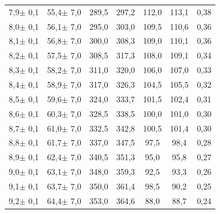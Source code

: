 \documentclass[titlepage = firstcover]{scrartcl}
\begin{document}
\begin{table}[h]
\begin{tabular}{c c c c c c c}
            7,9$\pm$ 0,1                &  55,4$\pm$ 7,0              &  289,5          &    297,2       &    112,0        &    113,1       &  0,38 \\
            8,0$\pm$ 0,1                &  56,1$\pm$ 7,0              &  295,0          &    303,0       &    109,5        &    110,6       &  0,36 \\
            8,1$\pm$ 0,1                &  56,8$\pm$ 7,0              &  300,0          &    308,3       &    109,0        &    110,1       &  0,36 \\
            8,2$\pm$ 0,1                &  57,5$\pm$ 7,0              &  308,5          &    317,3       &    108,0        &    109,1       &  0,34 \\
            8,3$\pm$ 0,1                &  58,2$\pm$ 7,0              &  311,0          &    320,0       &    106,0        &    107,0       &  0,33 \\
            8,4$\pm$ 0,1                &  58,9$\pm$ 7,0              &  317,0          &    326,3       &    104,5        &    105,5       &  0,32 \\
            8,5$\pm$ 0,1                &  59,6$\pm$ 7,0              &  324,0          &    333,7       &    101,5        &    102,4       &  0,31 \\
            8,6$\pm$ 0,1                &  60,3$\pm$ 7,0              &  328,5          &    338,5       &    100,0        &    101,0       &  0,30 \\
            8,7$\pm$ 0,1                &  61,0$\pm$ 7,0              &  332,5          &    342,8       &    100,5        &    101,4       &  0,30 \\
            8,8$\pm$ 0,1                &  61,7$\pm$ 7,0              &  337,0          &    347,5       &    97,5         &    98,4        &  0,28 \\
            8,9$\pm$ 0,1                &  62,4$\pm$ 7,0              &  340,5          &    351,3       &    95,0         &    95,8        &  0,27 \\
            9,0$\pm$ 0,1                &  63,1$\pm$ 7,0              &  348,0          &    359,3       &    92,5         &    93,3        &  0,26 \\
            9,1$\pm$ 0,1                &  63,7$\pm$ 7,0              &  350,0          &    361,4       &    98,5         &    90,2        &  0,25 \\
            9,2$\pm$ 0,1                &  64,4$\pm$ 7,0              &  353,0          &    364,6       &    88,0         &    88,7        &  0,24 \\

\end{tabular}
\end{table}
\end{document}
